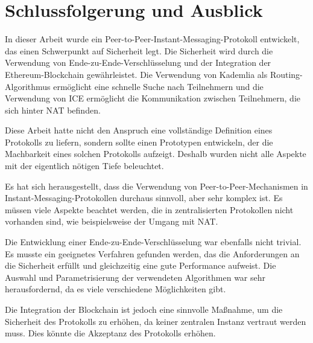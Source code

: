 \chapter{Schlussfolgerung und Ausblick}

In dieser Arbeit wurde ein Peer-to-Peer-Instant-Messaging-Protokoll entwickelt, das einen Schwerpunkt auf Sicherheit legt. Die Sicherheit wird durch die Verwendung von Ende-zu-Ende-Verschlüsselung und der Integration der Ethereum-Blockchain gewährleistet. Die Verwendung von Kademlia als Routing-Algorithmus ermöglicht eine schnelle Suche nach Teilnehmern und die Verwendung von ICE ermöglicht die Kommunikation zwischen Teilnehmern, die sich hinter NAT befinden.

Diese Arbeit hatte nicht den Anspruch eine vollständige Definition eines Protokolls zu liefern, sondern sollte einen Prototypen entwickeln, der die Machbarkeit eines solchen Protokolls aufzeigt. Deshalb wurden nicht alle Aspekte mit der eigentlich nötigen Tiefe beleuchtet. 

Es hat sich herausgestellt, dass die Verwendung von Peer-to-Peer-Mechanismen in Instant-Messaging-Protokollen durchaus sinnvoll, aber sehr komplex ist. Es müssen viele Aspekte beachtet werden, die in zentralisierten Protokollen nicht vorhanden sind, wie beispielsweise der Umgang mit NAT.

Die Entwicklung einer Ende-zu-Ende-Verschlüsselung war ebenfalls nicht trivial. Es musste ein geeignetes Verfahren gefunden werden, das die Anforderungen an die Sicherheit erfüllt und gleichzeitig eine gute Performance aufweist. Die Auswahl und Parametrisierung der verwendeten Algorithmen war sehr herausfordernd, da es viele verschiedene Möglichkeiten gibt. 

Die Integration der Blockchain ist jedoch eine sinnvolle Maßnahme, um die Sicherheit des Protokolls zu erhöhen, da keiner zentralen Instanz vertraut werden muss. Dies könnte die Akzeptanz des Protokolls erhöhen.